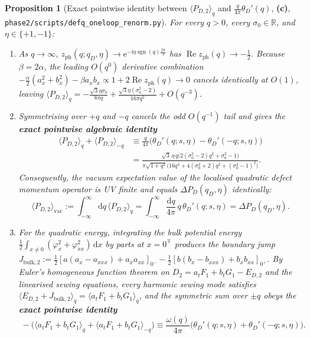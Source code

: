 \documentclass[11pt,a4paper]{article}
\newcommand{\Lc}{\textsf{\textbf{(c)}}}
\newcommand{\dd}{\mathrm{d}}
\newcommand{\ii}{\mathrm{i}}
\newcommand{\ee}{\mathrm{e}}
\newcommand{\sgn}{\operatorname{sgn}}
\newcommand{\Rea}{\operatorname{Re}}
\newcommand{\sren}{\texttt{phase2/\allowbreak scripts/\allowbreak defq\_\allowbreak oneloop\_\allowbreak renorm.py}}
\newtheorem{proposition}{Proposition}[section]
\theoremstyle{remark}
\begin{document}
\begin{proposition}[Exact pointwise identity between $\langle P_{D,2}\rangle_q$ and $\frac{q}{4\pi}\theta_D'(q)$, \Lc, \sren]\label{prop:PD2_identity}
For every $q > 0$, every $\sigma_0 \in \mathbb{R}$, and $\eta \in \{+1,-1\}$:
\begin{enumerate}
\item As $q \to \infty$, $z_{\mathrm{ph}}(q;q_D,\eta) \to \ee^{-\ii\eta\sgn(q)\frac{2\pi}{3}}$
 has $\Rea z_{\mathrm{ph}}(q) \to -\frac{1}{2}$. Because $\beta = 2\alpha$, the
leading $O(q^0)$ derivative combination $-\frac{\alpha}{2}(a_x^2+b_x^2) - \beta a_x b_x \propto 1 + 2\Rea z_{\mathrm{ph}}(q) \to 0$
cancels identically at $O(1)$, leaving $\langle P_{D,2}\rangle_q = -\frac{\sqrt{3}\eta\sigma_0}{8\pi q} + \frac{\sqrt{3}\eta(\sigma_0^2-2)}{16\pi q^2} + O(q^{-3})$.
\item Symmetrising over $+q$ and $-q$ cancels the odd $O(q^{-1})$ tail and gives
the \textbf{exact pointwise algebraic identity}
\begin{equation}\label{eq:PD2_pointwise}
  \boxed{\;
  \begin{aligned}
  \langle P_{D,2}\rangle_q + \langle P_{D,2}\rangle_{-q}
  &\equiv \frac{q}{4\pi}\Big(\theta_D'(q;s,\eta) - \theta_D'(-q;s,\eta)\Big) \\
  &= \frac{\sqrt{3}\,\eta\,q\big(2(\sigma_0^2-2)q^2 + \sigma_0^2 - 1\big)}
         {\pi\sqrt{1+q^2}\big(16q^4 + 4(\sigma_0^2+2)q^2 + (\sigma_0^2-1)^2\big)}.
  \end{aligned}
  \;}
\end{equation}
Consequently, the vacuum expectation value of the localised quadratic defect
momentum operator is UV finite and equals $\Delta P_D(q_D,\eta)$ identically:
\begin{equation}\label{eq:PD2_integral}
  \langle P_{D,2}\rangle_{\mathrm{vac}} := \int_{-\infty}^\infty \dd q\,\langle P_{D,2}\rangle_q
  = \int_{-\infty}^\infty \frac{\dd q}{4\pi}\,q\,\theta_D'(q;s,\eta) = \Delta P_D(q_D,\eta).
\end{equation}
\item For the quadratic energy, integrating the bulk potential energy
$\frac{1}{2}\int_{x\ne 0}(\varphi_x^2+\varphi_{xx}^2)\,\dd x$ by parts at $x=0^\mp$
produces the boundary jump $J_{\mathrm{bulk},2} := \frac{1}{2}[a(a_x-a_{xxx})+a_x a_{xx}]_{0^-} - \frac{1}{2}[b(b_x-b_{xxx})+b_x b_{xx}]_{0^+}$.
By Euler's homogeneous function theorem on $D_2 = a_t F_1 + b_t G_1 - E_{D,2}$
and the linearised sewing equations, every harmonic sewing mode satisfies
$\langle E_{D,2} + J_{\mathrm{bulk},2}\rangle_q = \langle a_t F_1 + b_t G_1\rangle_q$,
and the symmetric sum over $\pm q$ obeys the \textbf{exact pointwise identity}
\begin{equation}\label{eq:ED2_pointwise}
  \boxed{\;
  -\Big(\langle a_t F_1 + b_t G_1\rangle_q + \langle a_t F_1 + b_t G_1\rangle_{-q}\Big)
  \equiv \frac{\omega(q)}{4\pi}\Big(\theta_D'(q;s,\eta) + \theta_D'(-q;s,\eta)\Big).
  \;}
\end{equation}
\end{enumerate}
\end{proposition}
\end{document}
